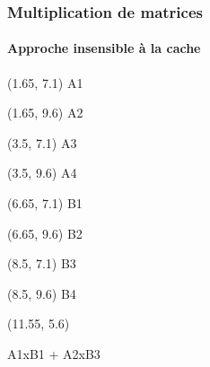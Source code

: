\documentclass{beamer}
\begin{document}
\begin{frame}[fragile]
\frametitle{Multiplication de matrices}
\framesubtitle{Approche insensible à la cache}

\begin{textblock}{5}(1.65, 7.1)
	 \Huge{A1}
\end{textblock}

\begin{textblock}{5}(1.65, 9.6)
	 \Huge{A2}
\end{textblock}

\begin{textblock}{5}(3.5, 7.1)
	 \Huge{A3}
\end{textblock}

\begin{textblock}{5}(3.5, 9.6)
	 \Huge{A4}
\end{textblock}

\begin{textblock}{5}(6.65, 7.1)
	 \Huge{B1}
\end{textblock}

\begin{textblock}{5}(6.65, 9.6)
	 \Huge{B2}
\end{textblock}

\begin{textblock}{5}(8.5, 7.1)
	 \Huge{B3}
\end{textblock}

\begin{textblock}{5}(8.5, 9.6)
	 \Huge{B4}
\end{textblock}

\begin{textblock}{1}(11.55, 5.6)
\begin{center}
A1xB1 + A2xB3
\end{center}	 
\end{textblock}


\end{frame}
\end{document}
